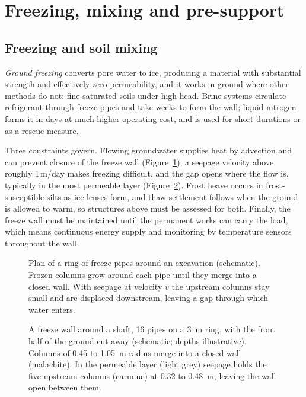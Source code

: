 \section{Freezing, mixing and pre-support}
\label{sec:freezing-presupport}

\subsection{Freezing and soil mixing}
\label{sec:freezing-mixing}

\emph{Ground freezing} converts pore water to ice, producing a material with
substantial strength and effectively zero permeability, and it works in ground
where other methods do not: fine saturated soils under high head. Brine
systems circulate refrigerant through freeze pipes and take weeks to form the
wall; liquid nitrogen forms it in days at much higher operating cost, and is
used for short durations or as a rescue measure.

Three constraints govern. Flowing groundwater supplies heat by advection and
can prevent closure of the freeze wall (Figure~\ref{fig:freeze-wall}); a seepage velocity above
roughly 1\,m/day makes freezing difficult, and the gap opens where the flow is,
typically in the most permeable layer (Figure~\ref{fig:r3d-freeze-wall}). Frost heave occurs in frost-susceptible
silts as ice lenses form, and thaw settlement follows when the ground is
allowed to warm, so structures above must be assessed for both. Finally, the freeze
wall must be maintained until the permanent works can carry the load, which
means continuous energy supply and monitoring by temperature sensors
throughout the wall.

\begin{figure}[htbp]
\centering
{}
\caption{Plan of a ring of freeze pipes around an excavation (schematic). Frozen columns grow around each pipe until they merge into a closed wall. With seepage at velocity $v$ the upstream columns stay small and are displaced downstream, leaving a gap through which water enters.}
\label{fig:freeze-wall}
\end{figure}

\begin{figure}[htbp]
\centering
{}
\caption{A freeze wall around a shaft, 16 pipes on a 3~m ring, with the front half of the ground cut away (schematic; depths illustrative). Columns of 0.45 to 1.05~m radius merge into a closed wall (malachite). In the permeable layer (light grey) seepage holds the five upstream columns (carmine) at 0.32 to 0.48~m, leaving the wall open between them.}
\label{fig:r3d-freeze-wall}
\end{figure}

